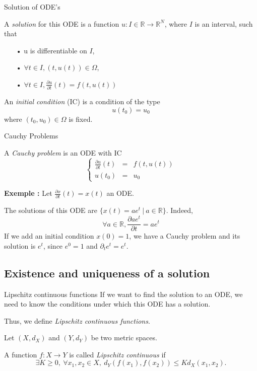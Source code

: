 \documentclass[11pt]{beamer}
\begin{document}
\begin{frame}{Solution of ODE's}
\begin{definition}
A \textit{solution} for this ODE is a function $u : I\in \mathbb{R} \rightarrow \mathbb{R}^N$, where $I$ is an interval, such that
	\begin{itemize}
	\item[•] u is differentiable on $I$,
	\item[•] $\forall t \in I, (t, u(t)) \in \Omega$,
	\item[•] $\forall t \in I, \frac{\partial u}{\partial t}(t) = f(t, u(t))$
	\end{itemize}
\end{definition}

\begin{definition}
An \textit{initial condition} (IC) is a condition of the type
$$
u(t_0) = u_0
$$
where $(t_0, u_0) \in \Omega$ is fixed.
\end{definition}
\end{frame}

\begin{frame}{Cauchy Problems}
\begin{definition}
A \textit{Cauchy problem} is an ODE with IC
$$
\left \{
\begin{array}{rcl}
\frac{\partial u}{\partial t}(t) & = & f(t, u(t)) \\
u(t_0) & = & u_0
\end{array}
\right.
$$
\end{definition}
\textbf{Exemple :} Let $\frac{\partial x}{\partial t}(t) = x(t)$ an ODE. 

The solutions of this ODE are
$
\{ x(t) = ae^t\ |\ a\in \mathbb{R}\}.
$
Indeed,
$$
\forall a \in \mathbb{R}, \frac{\partial ae^t}{\partial t} = ae^t
$$
If we add an initial condition $x(0) = 1$, we have a Cauchy problem and its solution is $e^t$, since $e^0 = 1$ and $\partial_te^t = e^t$.
\end{frame}

\subsection{Existence and uniqueness of a solution} \label{exiunique}
\begin{frame}{Lipschitz continuous functions}
If we want to find the solution to an ODE, we need to know the conditions under which this ODE has a solution. 

Thus, we define \textit{Lipschitz continuous functions}. 

\begin{definition}
Let $(X, d_X)$ and $(Y, d_Y)$ be two metric spaces.  

A function $f: X \rightarrow  Y$ is called \textit{Lipschitz continuous} if
$$
\exists K \geq 0, \  \forall x_1, x_2 \in X, \  d_Y(f(x_1), f(x_2)) \leq Kd_X(x_1, x_2).
$$
\end{definition}
\end{frame}
\end{document}
